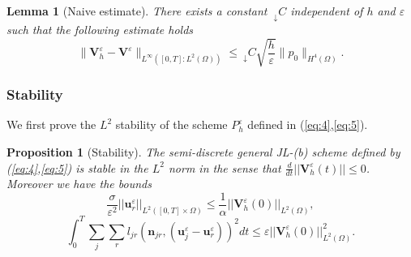 \documentclass[a4paper,french,english,10pt]{article}
\newcommand\njr{\mathbf{n}_{jr}}
\newcommand\uu{\mathbf{u}}
\newcommand\eps{\varepsilon}
\newcommand\uj{\uu_j}
\newcommand\ur{\uu_r}
\newcommand\V{\mathbf{V}}
\newtheorem{lemma}[theorem]{Lemma}
\newtheorem{pro}[theorem]{Proposition}
\begin{document}
\begin{lemma}[Naive estimate]\label{ein_prosit}
There exists a constant $~_\downarrow C$ independent of
$h$ and $\eps$
such that the following estimate holds
\begin{equation} \label{eq:veps2}
\|\V^{\eps}_h-\V^{\eps}\|_{L^\infty( [0,T]: L^2  (\Omega) )}\leq
{~_\downarrow C}%
\sqrt{\frac h \eps}\| p_0\|_{H^4(\Omega)}.
\end{equation}
\end{lemma}


\subsubsection{Stability}

We first prove the $L^{2}$ stability of  the scheme $P_h^\varepsilon $ defined 
in (\ref{eq:4},\ref{eq:5}). %
\begin{pro}[Stability] \label{propesti} %
The
semi-discrete general JL-(b) scheme defined by (\ref{eq:4},\ref{eq:5})  is
stable in the $L^2$ norm in the sense that $\frac{d}{dt}
 \vert\vert \V^{\eps}_{h}(t)
\vert\vert \leq 0$.
 Moreover we have the bounds
\begin{equation}\label{gggg}
\frac{\sigma}{\eps^2}\vert\vert \uu_r^{\eps} \vert\vert_{L^2([0,T]\times \Omega)}\leq
\frac{1}{\alpha}
\vert\vert
\V^{\eps}_h(0)\vert\vert_{L^2( \Omega)},
\end{equation}
\begin{equation}\label{gs}
\int_0^T\sum_j \sum_r
l_{jr}(\njr,(\uj^\eps-\ur^\eps))^{2} dt\leq \eps \vert\vert
\mathbf V^{\eps}_h(0)\vert\vert^2_{L^2( \Omega)} .
\end{equation}
\end{pro}
\end{document}
